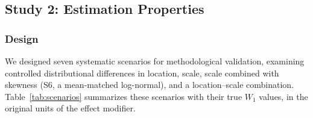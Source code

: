 \documentclass[AMA,Times1COL]{WileyNJDv5}
\begin{document}



\subsection{Study 2: Estimation Properties}\label{sec:study2}


\subsubsection{Design}\label{sec:sim_design}

We designed seven systematic scenarios for methodological validation, examining controlled distributional differences in location, scale, scale combined with skewness (S6, a mean-matched log-normal), and a location--scale combination. Table~\ref{tab:scenarios} summarizes these scenarios with their true $W_1$ values, in the original units of the effect modifier.
\end{document}
